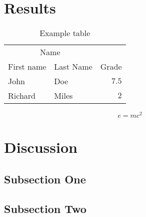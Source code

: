 \documentclass[twoside]{article}
\begin{document}
\begin{multicols}{2}
\section{Results}

\begin{table}[H]
\caption{Example table}
\centering
\begin{tabular}{llr}
\toprule
\multicolumn{2}{c}{Name} \\
\cmidrule(r){1-2}
First name & Last Name & Grade \\
\midrule
John & Doe & $7.5$ \\
Richard & Miles & $2$ \\
\bottomrule
\end{tabular}
\end{table}

\lipsum[5] %

\begin{equation}
\label{eq:emc}
e = mc^2
\end{equation}

\lipsum[6] %


\section{Discussion}

\subsection{Subsection One}

\lipsum[7] %

\subsection{Subsection Two}

\lipsum[8] %


 

 


\end{multicols}
\end{document}
